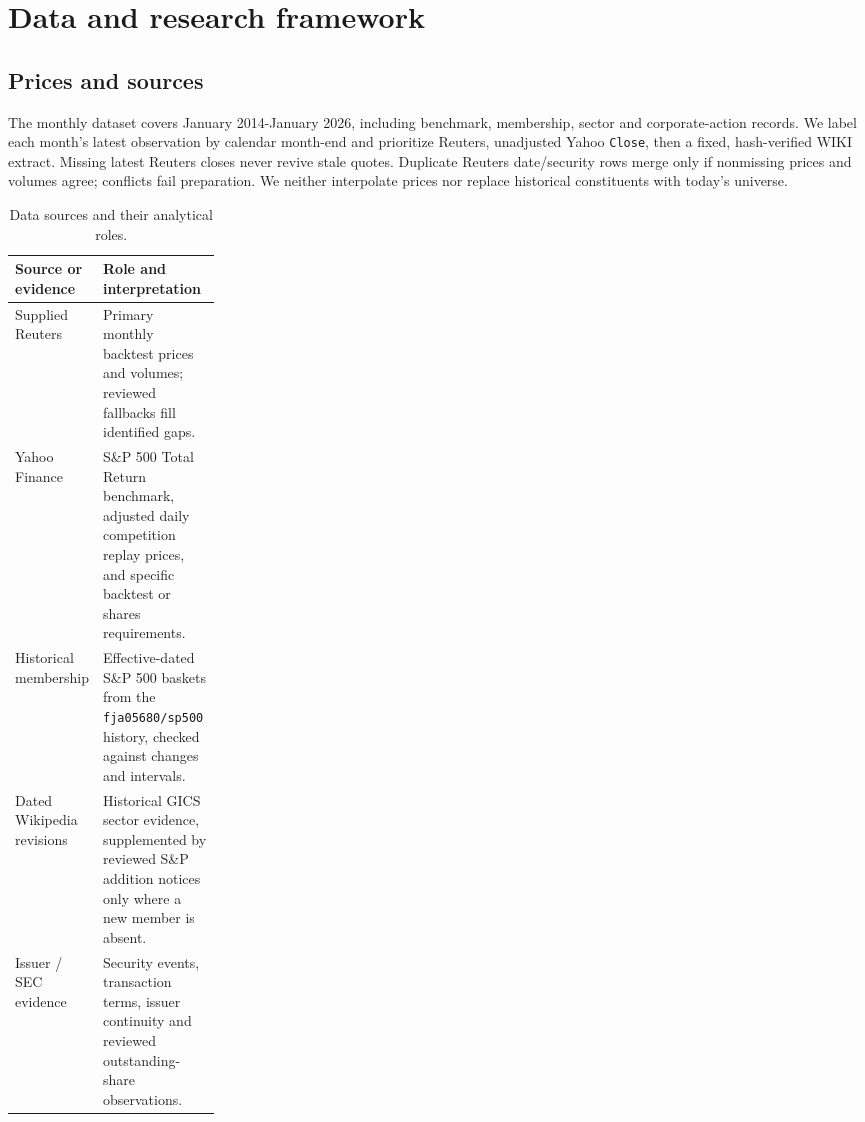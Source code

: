 \section{Data and research framework}
\label{sec:data}

\subsection{Prices and sources}

The monthly dataset covers January 2014-January 2026, including benchmark,
membership, sector and corporate-action records. We label each month's latest
observation by calendar month-end and prioritize Reuters, unadjusted Yahoo
\texttt{Close}, then a fixed, hash-verified WIKI extract. Missing latest Reuters
closes never revive stale quotes. Duplicate Reuters date/security rows merge
only if nonmissing prices and volumes agree; conflicts fail preparation.
We neither interpolate prices nor replace historical constituents with today's
universe.

\begin{table}[htbp]
\centering
\begin{threeparttable}
\small
\begin{tabularx}{\linewidth}{@{}>{\raggedright\arraybackslash}p{0.24\linewidth}X@{}}
\toprule
\textbf{Source or evidence} & \textbf{Role and interpretation} \\
\midrule
Supplied Reuters & Primary monthly backtest prices and volumes; reviewed
fallbacks fill identified gaps. \\
Yahoo Finance & S\&P 500 Total Return benchmark, adjusted daily competition
replay prices, and specific backtest or shares requirements. \\
Historical membership & Effective-dated S\&P 500 baskets from the
\texttt{fja05680/sp500} history, checked against changes and intervals. \\
Dated Wikipedia revisions & Historical GICS sector evidence, supplemented by
reviewed S\&P addition notices only where a new member is absent. \\
Issuer / SEC evidence & Security events, transaction terms, issuer
continuity and reviewed outstanding-share observations. \\
\bottomrule
\end{tabularx}
\caption[Data sources and analytical roles]{Data sources and their analytical roles.}
\label{tab:data-sources}
\end{threeparttable}
\end{table}

